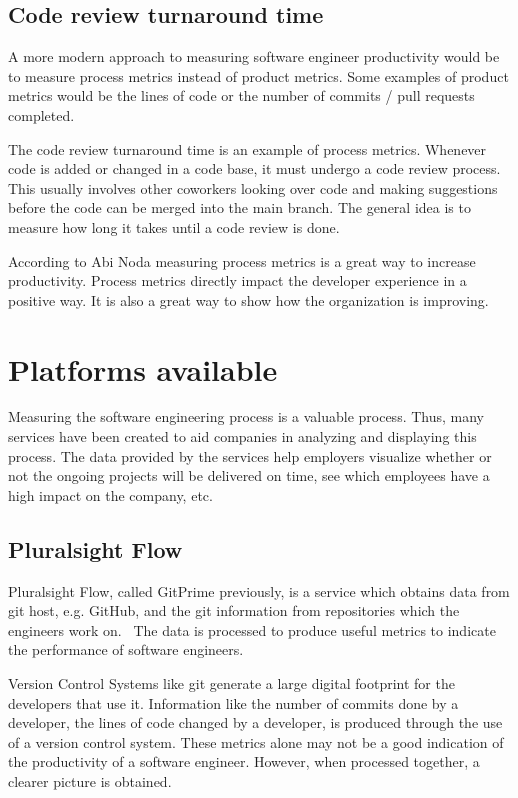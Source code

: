 \documentclass{article}
\begin{document}
\subsection{Code review turnaround time}
A more modern approach to measuring software engineer productivity would be to
measure process metrics instead of product metrics. Some examples of product
metrics would be the lines of code or the number of commits / pull requests
completed.

The code review turnaround time is an example of process metrics. Whenever code
is added or changed in a code base, it must undergo a code review process. This
usually involves other coworkers looking over code and making suggestions
before the code can be merged into the main branch. The general idea is to
measure how long it takes until a code review is done.

According to Abi Noda measuring process metrics is a great way to increase
productivity. Process metrics directly impact the developer experience in a
positive way. It is also a great way to show how the organization is
improving.~\cite{elusive2019quest}

\section{Platforms available}
Measuring the software engineering process is a valuable process. Thus, many
services have been created to aid companies in analyzing and displaying this
process.  The data provided by the services help employers visualize whether or
not the ongoing projects will be delivered on time, see which employees have a
high impact on the company, etc.

\subsection{Pluralsight Flow}
Pluralsight Flow, called GitPrime previously, is a service which obtains data
from git host, e.g. GitHub, and the git information from repositories which the
engineers work on.~\cite{plural2019sight} The data is processed to produce
useful metrics to indicate the performance of software engineers.

Version Control Systems like git generate a large digital footprint for the
developers that use it. Information like the number of commits done by a
developer, the lines of code changed by a developer, is produced through the
use of a version control system. These metrics alone may not be a good
indication of the productivity of a software engineer. However, when processed
together, a clearer picture is obtained.
\end{document}

